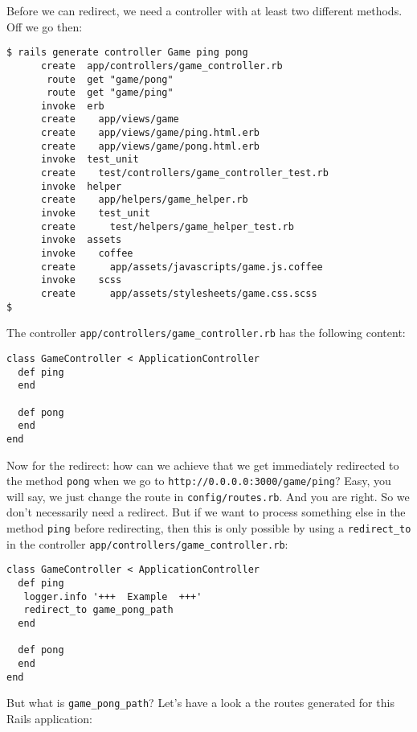 \documentclass[a4paper]{book}
\begin{document}
Before we can redirect, we need a controller with at least two different methods. Off we go then:

\begin{shaded}\begin{verbatim}
$ rails generate controller Game ping pong
      create  app/controllers/game_controller.rb
       route  get "game/pong"
       route  get "game/ping"
      invoke  erb
      create    app/views/game
      create    app/views/game/ping.html.erb
      create    app/views/game/pong.html.erb
      invoke  test_unit
      create    test/controllers/game_controller_test.rb
      invoke  helper
      create    app/helpers/game_helper.rb
      invoke    test_unit
      create      test/helpers/game_helper_test.rb
      invoke  assets
      invoke    coffee
      create      app/assets/javascripts/game.js.coffee
      invoke    scss
      create      app/assets/stylesheets/game.css.scss
$
\end{verbatim}\end{shaded}

The controller \texttt{app/controllers/game\_controller.rb} has the following content:

\begin{shaded}\begin{verbatim}
class GameController < ApplicationController
  def ping
  end

  def pong
  end
end
\end{verbatim}\end{shaded}

Now for the redirect: how can we achieve that we get immediately redirected to the method \texttt{pong} when we go to \texttt{http://0.0.0.0:3000/game/ping}? Easy, you will say, we just change the route in \texttt{config/routes.rb}. And you are right. So we don't necessarily need a redirect. But if we want to process something else in the method \texttt{ping} before redirecting, then this is only possible by using a \texttt{redirect\_to} in the controller \texttt{app/controllers/game\_controller.rb}:

\begin{shaded}\begin{verbatim}
class GameController < ApplicationController
  def ping
   logger.info '+++  Example  +++'
   redirect_to game_pong_path
  end

  def pong
  end
end
\end{verbatim}\end{shaded}

But what is \texttt{game\_pong\_path}? Let's have a look a the routes generated for this Rails application:
\end{document}
